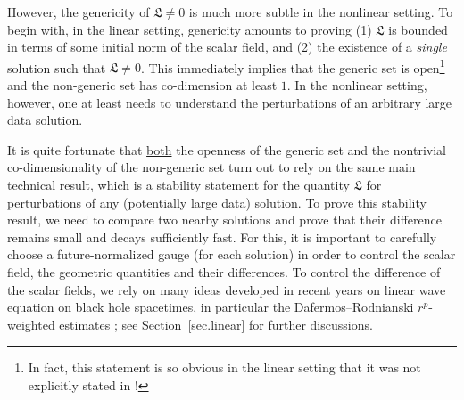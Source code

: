\documentclass[10pt, reqno]{amsart}
\theoremstyle{definition}
\theoremstyle{remark}
\theoremstyle{conjecture}
\numberwithin{equation}{section}
\newcommand{\0}{\emptyset}
\begin{document}
However, the genericity of $\mathfrak L\neq 0$ is much more subtle in the nonlinear setting. To begin with, in the linear setting, genericity amounts to proving (1) $\mathfrak L$ is bounded in terms of some initial norm of the scalar field, and (2) the existence of a \emph{single} solution such that $\mathfrak L\neq 0$. This immediately implies that the generic set is open\footnote{In fact, this statement is so obvious in the linear setting that it was not explicitly stated in \cite{LO.instab}!} and the non-generic set has co-dimension at least $1$. In the nonlinear setting, however, one at least needs to understand the perturbations of an arbitrary large data solution.

It is quite fortunate that \underline{both} the openness of the generic set and the nontrivial co-dimensionality of the non-generic set turn out to rely on the same main technical result, which is a stability statement for the quantity $\mathfrak L$ for perturbations of any (potentially large data) solution. To prove this stability result, we need to compare two nearby solutions and prove that their difference remains small and decays sufficiently fast. For this, it is important to carefully choose a future-normalized gauge (for each solution) in order to control the scalar field, the geometric quantities and their differences. To control the difference of the scalar fields, we rely on many ideas developed in recent years on linear wave equation on black hole spacetimes, in particular the Dafermos--Rodnianski $r^p$-weighted estimates \cite{DRNM}; see Section~\ref{sec.linear} for further discussions.
\end{document}

